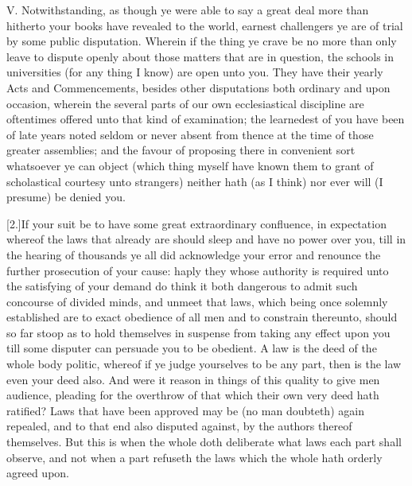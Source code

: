 V. Notwithstanding, as though ye were able to say a great deal more than hitherto your books have revealed to the world, earnest challengers ye are of trial by some public disputation. Wherein if the thing ye crave be no more than only leave to dispute openly about those matters that are in question, the schools in universities (for any thing I know) are open unto you. They have their yearly Acts and Commencements, besides other disputations both ordinary and upon occasion, wherein the several parts of our own ecclesiastical discipline are oftentimes offered unto that kind of examination; the learnedest of you have been of late years noted seldom or never absent from thence at the time of those greater assemblies; and the favour of proposing there in convenient sort whatsoever ye can object (which thing myself have known them to grant of scholastical courtesy unto strangers) neither hath (as I think) nor ever will (I presume) be denied you.

[2.]If your suit be to have some great extraordinary confluence, in expectation whereof the laws that already are should sleep and have no power over you, till in the hearing of thousands ye all did acknowledge your error and renounce the further prosecution of your cause: haply they whose authority is required unto the satisfying of your demand do think it both dangerous to admit such concourse of divided minds, and unmeet that laws, which being once solemnly established are to exact obedience of all men and to constrain thereunto, should so far stoop as to hold themselves in suspense from taking any effect upon you till some disputer can persuade you to be obedient. A law is the deed of the whole body politic, whereof if ye judge yourselves to be any part, then is the law even your deed also. And were it reason in things of this quality to give men audience, pleading for the overthrow of that which their own very deed hath ratified? Laws that have been approved may be (no man doubteth) again repealed, and to that end also disputed against, by the authors thereof themselves. But this is when the whole doth deliberate what laws each part shall observe, and not when a part refuseth the laws which the whole hath orderly agreed upon.


